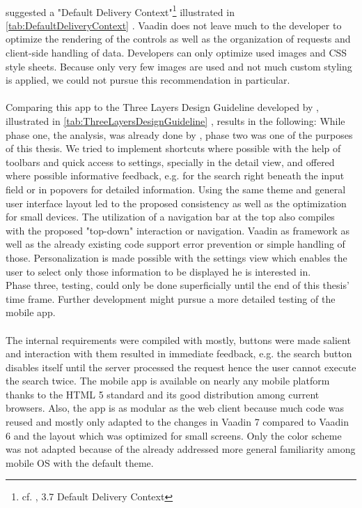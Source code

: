 \\
\cite{WorldWideWebConsortium.2008} suggested a "Default Delivery Context"\footnote{cf. \cite{WorldHealthOrganization.2011}, 3.7 Default Delivery Context} illustrated in \ref{tab:DefaultDeliveryContext} . Vaadin does not leave much to the developer to optimize the rendering of the controls as well as the organization of requests and client-side handling of data. Developers can only optimize used images and CSS style sheets. Because only very few images are used and not much custom styling is applied, we could not pursue this recommendation in particular.
\\
\\
Comparing this app to the Three Layers Design Guideline developed by \cite{AyobNurulZakiahbinti.2009}, illustrated in \ref{tab:ThreeLayersDesignGuideline} , results in the following: While phase one, the analysis, was already done by \cite{Dehling.2012}, phase two was one of the purposes of this thesis. We tried to implement shortcuts where possible with the help of toolbars and quick access to settings, specially in the detail view, and offered where possible informative feedback, e.g. for the search right beneath the input field or in popovers for detailed information. Using the same theme and general user interface layout led to the proposed consistency as well as the optimization for small devices. The utilization of a navigation bar at the top also compiles with the proposed "top-down" interaction or navigation. Vaadin as framework as well as the already existing code support error prevention or simple handling of those. Personalization is made possible with the settings view which enables the user to select only those information to be displayed he is interested in.
\\
Phase three, testing, could only be done superficially until the end of this thesis' time frame. Further development might pursue a more detailed testing of the mobile app.
\\
\\
The internal requirements were compiled with mostly, buttons were made salient and interaction with them resulted in immediate feedback, e.g. the search button disables itself until the server processed the request hence the user cannot execute the search twice. The mobile app is available on nearly any mobile platform thanks to the HTML 5 standard and its good distribution among current browsers. Also, the app is as modular as the web client because much code was reused and mostly only adapted to the changes in Vaadin 7 compared to Vaadin 6 and the layout which was optimized for small screens. Only the color scheme was not adapted because of the already addressed more general familiarity among mobile OS with the default theme.
